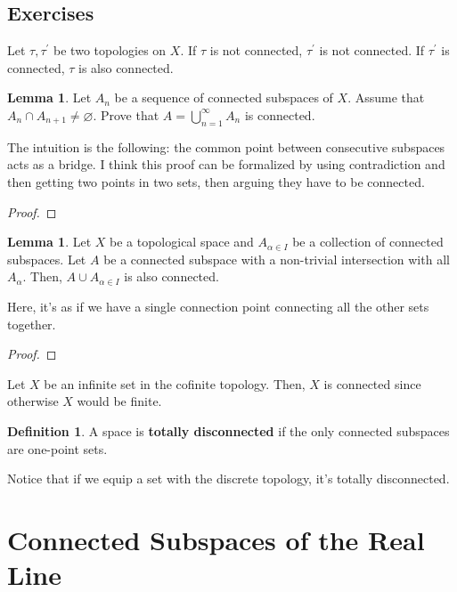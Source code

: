 \documentclass{article}
\theoremstyle{definition}
\newtheorem{definition}{Definition}
\newtheorem{lemma}[theorem]{Lemma}
\begin{document}
\subsection{Exercises}

Let $\tau, \tau^{\prime}$ be two topologies on $X$. If $\tau$ is not connected, $\tau^{\prime}$ is not connected. 
If $\tau^{\prime}$ is connected, $\tau$ is also connected.

\begin{lemma}
    Let $A_{n}$ be a sequence of connected subspaces of $X$. Assume that
    $A_{n} \cap A_{n+1} \neq \varnothing$. Prove that $A = \bigcup_{n = 1}^{\infty} A_{n}$
    is connected.
\end{lemma}

The intuition is the following: the common point between consecutive subspaces acts
as a bridge. I think this proof can be formalized by using contradiction and then
getting two points in two sets, then arguing they have to be connected.

\begin{proof}
    
\end{proof}

\begin{lemma}
    Let $X$ be a topological space and $A_{\alpha \in I}$ be a collection
    of connected subspaces. Let $A$ be a connected subspace with a non-trivial
    intersection with all $A_{\alpha}$. Then, $A \cup A_{\alpha \in I}$ is
    also connected.
\end{lemma}

Here, it's as if we have a single connection point connecting all the other
sets together.

\begin{proof}
    
\end{proof}

Let $X$ be an infinite set in the cofinite topology. Then, $X$ is connected since
otherwise $X$ would be finite.

\begin{definition}
    A space is \textbf{totally disconnected} if the only connected subspaces
    are one-point sets.
\end{definition}

Notice that if we equip a set with the discrete topology, it's totally disconnected.


\newpage

\section{Connected Subspaces of the Real Line}
\end{document}

